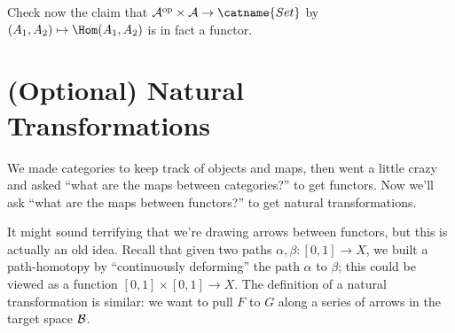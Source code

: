 \begin{exercise}
	Check now the claim that $\AA\op \times \AA \to \catname{Set}$
	by $(A_1, A_2) \mapsto \Hom(A_1, A_2)$ is in fact a functor.
\end{exercise}

\section{(Optional) Natural Transformations}
We made categories to keep track of objects and maps, then went a little crazy and asked
``what are the maps between categories?'' to get functors.
Now we'll ask ``what are the maps between functors?'' to get natural transformations.

It might sound terrifying that we're drawing arrows between functors, but this is actually an old idea.
Recall that given two paths $\alpha, \beta : [0,1] \to X$,
we built a path-homotopy by ``continuously deforming'' the path $\alpha$ to $\beta$;
this could be viewed as a function $[0,1] \times [0,1] \to X$.
The definition of a natural transformation is similar: we want to pull $F$ to $G$
along a series of arrows in the target space $\mathcal B$.

